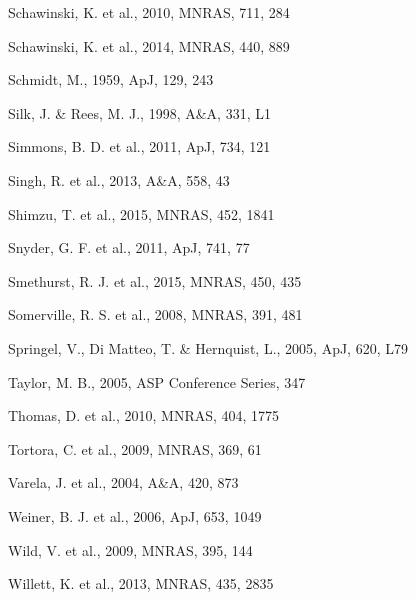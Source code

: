 \documentclass[useAMS,usenatbib]{mn2e}
\begin{document}
\begin{thebibliography}{}
 Schawinski, K. et al., 2010, MNRAS, 711, 284

 Schawinski, K. et al., 2014, MNRAS, 440, 889

 Schmidt, M., 1959, ApJ, 129, 243

 Silk, J. \& Rees, M. J., 1998, A\&A, 331, L1

 Simmons, B. D. et al., 2011, ApJ, 734, 121

 Singh, R. et al., 2013, A\&A, 558, 43

 Shimzu, T. et al., 2015, MNRAS, 452, 1841


 Snyder, G. F. et al., 2011, ApJ, 741, 77

 Smethurst, R. J. et al., 2015, MNRAS, 450, 435

 Somerville, R. S. et al., 2008, MNRAS, 391, 481

 Springel, V., Di Matteo, T. \& Hernquist, L., 2005, ApJ, 620, L79

 Taylor, M. B., 2005, ASP Conference Series, 347

 Thomas, D. et al., 2010, MNRAS, 404, 1775

 Tortora, C. et al., 2009, MNRAS, 369, 61

 Varela, J. et al., 2004, A\&A, 420, 873

 Weiner, B. J. et al., 2006, ApJ, 653, 1049

 Wild, V. et al., 2009, MNRAS, 395, 144

 Willett, K. et al., 2013, MNRAS, 435, 2835


\end{thebibliography}
\end{document}
